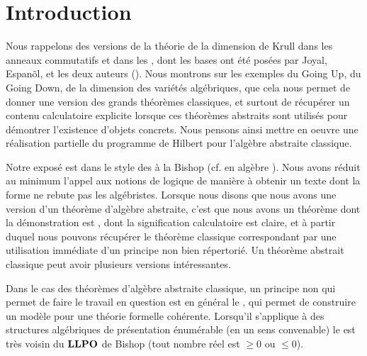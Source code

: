 \newpage

\tableofcontents



\newpage
{}
\section*{Introduction} \label{sec Introduction}
Nous rappelons des versions \covs de la théorie de la dimension de Krull 
dans les anneaux commutatifs et dans les \trdis, dont les bases ont 
été posées par Joyal, Espan\~ol, et les deux auteurs 
(\cite{cc,esp,joy,lom}). Nous montrons sur les exemples du Going Up, du Going 
Down, de la dimension des variétés algébriques,  que cela nous 
permet de donner une version \cov des grands théorèmes classiques, et 
surtout de récupérer un contenu calculatoire explicite lorsque ces 
théorèmes abstraits sont utilisés pour démontrer l'existence 
d'objets concrets. Nous pensons ainsi mettre en oeuvre une réalisation 
partielle du programme de Hilbert pour l'algèbre abstraite classique. 

Notre exposé est dans le style des \coma à la Bishop 
(cf. en algèbre \cite{MRR}). Nous avons réduit au minimum l'appel aux 
notions de logique de manière à obtenir un texte dont la forme ne 
rebute pas les algébristes.
Lorsque nous disons que nous avons une version \cov d'un théorème 
d'algèbre abstraite, c'est que nous avons un théorème dont la démonstration 
est \cov, dont la signification calculatoire est claire, et à partir 
duquel nous pouvons récupérer le théorème classique correspondant 
par une utilisation immédiate d'un principe non \cof bien 
répertorié. Un théorème abstrait classique peut avoir plusieurs 
versions \covs intéressantes. 

Dans le cas des théorèmes d'algèbre abstraite classique, un principe 
non \cof qui permet de faire le travail en question est en général le 
\tcg, qui permet de construire un modèle pour une théorie formelle 
cohérente. Lorsqu'il s'applique à des structures algébriques de 
présentation énumérable (en un sens convenable) le \tcg est très voisin du ${\bf LLPO}$ de Bishop (tout nombre réel est $\geq 0$  
ou $\leq 0$). 

